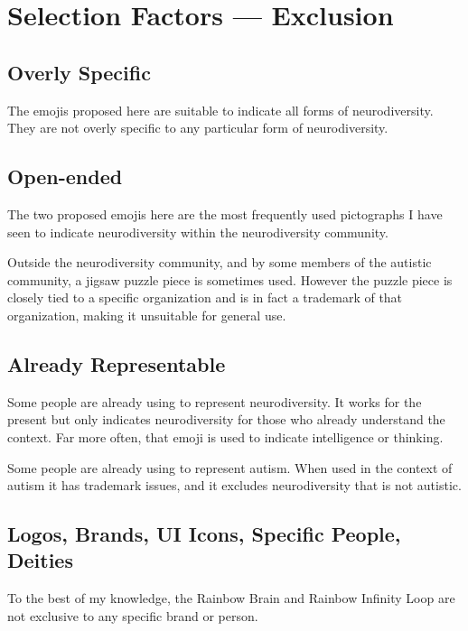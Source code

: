 \section{Selection Factors --- Exclusion}

\setcounter{subsection}{5}

\subsection{Overly Specific}

The emojis proposed here are suitable to indicate all forms of neurodiversity. They are not
overly specific to any particular form of neurodiversity.

\subsection{Open-ended}

The two proposed emojis here are the most frequently used pictographs I have seen to indicate
neurodiversity within the neurodiversity community.

Outside the neurodiversity community, and by some members of the autistic community, a jigsaw
puzzle piece is sometimes used. However the puzzle piece is closely tied to a specific organization
and is in fact a trademark of that organization, making it unsuitable for general use.

\subsection{Already Representable}

Some people are already using \brainemoji{} to represent neurodiversity.
It works for the present but only indicates neurodiversity for those
who already understand the context. Far more often, that emoji is used to indicate intelligence
or thinking.

Some people are already using \jigsawemoji{} to represent autism.
When used in the context of autism it has trademark issues, and it
excludes neurodiversity that is not autistic.

\subsection{Logos, Brands, UI Icons, Specific People, Deities}

To the best of my knowledge, the Rainbow Brain and Rainbow Infinity Loop are not exclusive to
any specific brand or person.


